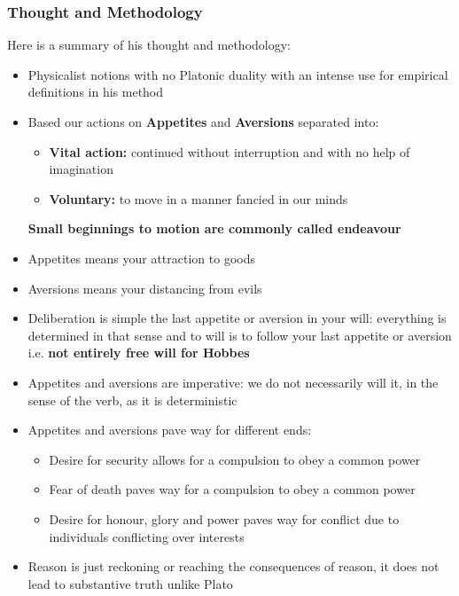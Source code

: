 \documentclass[12pt, letterpaper]{article}
\begin{document}
\subsubsection{Thought and Methodology}
Here is a summary of his thought and methodology:
\begin{itemize}
	\item Physicalist notions with no Platonic duality with an intense use for empirical definitions in his method
	\item Based our actions on \textbf{Appetites} and \textbf{Aversions} separated into:
		\begin{itemize}
			\item \textbf{Vital action:} continued without interruption and with no help of imagination
			\item \textbf{Voluntary:} to move in a manner fancied in our minds
		\end{itemize}
		\textbf{Small beginnings to motion are commonly called endeavour}
	\item Appetites means your attraction to goods
	\item Aversions means your distancing from evils
	\item Deliberation is simple the last appetite or aversion in your will: everything is determined in that sense and to will is to follow your last appetite or aversion i.e. \textbf{not entirely free will for Hobbes}
	\item Appetites and aversions are imperative: we do not necessarily will it, in the sense of the verb, as it is deterministic
	\item Appetites and aversions pave way for different ends:
		\begin{itemize}
			\item Desire for security allows for a compulsion to obey a common power
			\item Fear of death paves way for a compulsion to obey a common power
			\item Desire for honour, glory and power paves way for conflict due to individuals conflicting over interests
		\end{itemize}
	\item Reason is just reckoning or reaching the consequences of reason, it does not lead to substantive truth unlike Plato
\end{itemize}
\end{document}

